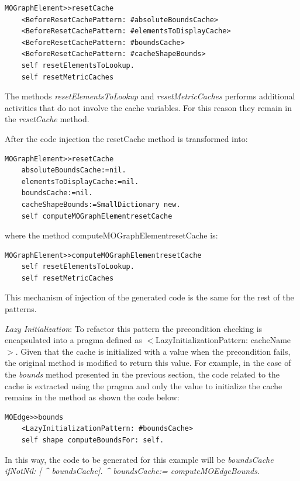 \documentclass[preprint,10pt]{sigplanconf}
\begin{document}
\begin{lstlisting} 
MOGraphElement>>resetCache 
	<BeforeResetCachePattern: #absoluteBoundsCache> 
	<BeforeResetCachePattern: #elementsToDisplayCache>
	<BeforeResetCachePattern: #boundsCache> 
	<BeforeResetCachePattern: #cacheShapeBounds> 
	self resetElementsToLookup. 
	self resetMetricCaches
\end{lstlisting}

The methods \emph{resetElementsToLookup} and \emph{resetMetricCaches} 
performs additional activities that do not involve the cache variables. For this reason they remain in the \emph{resetCache} method.

After the code injection the resetCache method is transformed into:

\begin{lstlisting} 
MOGraphElement>>resetCache 
	absoluteBoundsCache:=nil.
	elementsToDisplayCache:=nil. 
	boundsCache:=nil. 
	cacheShapeBounds:=SmallDictionary new. 
	self computeMOGraphElementresetCache 
\end{lstlisting}

where the method computeMOGraphElementresetCache is:

\begin{lstlisting} 
MOGraphElement>>computeMOGraphElementresetCache
	self resetElementsToLookup. 
	self resetMetricCaches 
\end{lstlisting}

This mechanism of injection of the generated code is the same for
the rest of the patterns.

\emph{Lazy Initialization}: To refactor this pattern
the precondition checking is encapsulated into a pragma defined as
$<$LazyInitializationPattern: cacheName$>$. Given that
the cache is initialized with a value when the precondition fails,
the original method is modified to return this value. For example,
in the case of the \emph{bounds} method presented in the previous
section, the code related to the cache is extracted using the pragma
and only the value to initialize the cache remains in the method as
shown the code below:

\begin{lstlisting} 
MOEdge>>bounds 
	<LazyInitializationPattern: #boundsCache> 
	self shape computeBoundsFor: self. 
\end{lstlisting}

In this way, the code to be generated for this example will be \emph{boundsCache
ifNotNil: {[} \textasciicircum{} boundsCache{]}. \textasciicircum{}
boundsCache:= computeMOEdgeBounds.}
\end{document}
